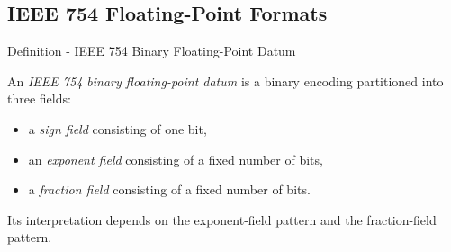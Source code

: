 
\subsection*{IEEE 754 Floating-Point Formats}

\providecommand{\IEEEFloatLayout}[8]{%
\begin{center}
\begin{tikzpicture}[x=#1 cm,y=0.8cm]
    \pgfmathsetmacro{\SignEnd}{#2}
    \pgfmathsetmacro{\ExpEnd}{#2 + #3}
    \pgfmathsetmacro{\FracEnd}{#2 + #3 + #4}
    \pgfmathtruncatemacro{\SignBitLabel}{#5 - 1}

    \draw (0,0) rectangle (\SignEnd,1);
    \draw (\SignEnd,0) rectangle (\ExpEnd,1);
    \draw (\ExpEnd,0) rectangle (\FracEnd,1);

    \node at ({\SignEnd/2},0.5) {\small $s$};
    \node at ({(\SignEnd+\ExpEnd)/2},0.5) {\small exponent};
    \node at ({(\ExpEnd+\FracEnd)/2},0.5) {\small fraction};

    \node[above] at (0.5,1) {\scriptsize #5};
    \node[above] at ({\SignEnd+0.5},1) {\scriptsize \SignBitLabel};
    \node[above] at ({\ExpEnd-0.5},1) {\scriptsize #6};
    \node[above] at ({\ExpEnd+0.5},1) {\scriptsize #7};
    \node[above] at ({\FracEnd-0.5},1) {\scriptsize 0};
\end{tikzpicture}
\end{center}
}



\begin{definitionbox}{Definition - IEEE 754 Binary Floating-Point Datum}
\begin{definition}
\label{def:numerical-analysis-ieee-754-binary-floating-point-datum}
An \emph{IEEE 754 binary floating-point datum} is a binary encoding partitioned into
three fields:

\begin{itemize}
    \item a \emph{sign field} consisting of one bit,
    \item an \emph{exponent field} consisting of a fixed number of bits,
    \item a \emph{fraction field} consisting of a fixed number of bits.
\end{itemize}

Its interpretation depends on the exponent-field pattern and the fraction-field pattern.
\end{definition}

\NoLocalDependencies
\end{definitionbox}

